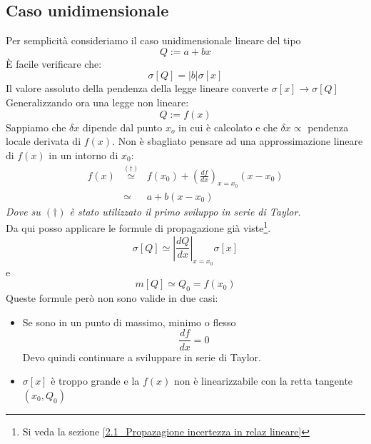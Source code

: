 \documentclass[11pt,a4paper]{book}
\begin{document}
\subsection{Caso unidimensionale} \label{Propagazione incertezza in relazione lineare}
Per semplicità consideriamo il caso unidimensionale lineare del tipo
\begin{equation}
 Q := a + bx
\end{equation}
\`{E} facile verificare che:
\begin{equation}
\sigma[Q] = | b | \sigma[x]
\end{equation}
Il valore assoluto della pendenza della legge lineare converte $ \sigma [x] \to \sigma[Q]$
Generalizzando ora una legge non lineare:
\begin{equation}
 Q := f(x)
\end{equation}
Sappiamo che $ \delta x $ dipende dal punto $ x_o $ in cui è calcolato e che $ \delta x \propto $ pendenza locale derivata di $ f(x) $. Non è sbagliato pensare ad una approssimazione lineare di $ f(x) $ in un intorno di $ x_0 $:
\begin{eqnarray}
f(x)  &\stackrel{(\dag)}{\simeq}& f(x_0)+ \left( \frac{df}{dx}\right)_{x = x_0} (x-x_0)	\\
&\simeq& a +b(x - x_0)
\end{eqnarray}
\textit{Dove su $ (\dag) $ è stato utilizzato il primo sviluppo in serie di Taylor.}\\
Da qui posso applicare le formule di propagazione già viste\footnote{Si veda la sezione \ref{2.1_Propazagione incertezza in relaz lineare}}.
\begin{equation}
\sigma[Q]\simeq \left| \frac{dQ}{dx} \right|_{x = x_0} \sigma[x]
\end{equation}
e
\begin{equation}
m[Q]\simeq Q_0 = f(x_0)
\end{equation}
Queste formule però non sono valide in due casi:
\begin{itemize}
\item Se sono in un punto di massimo, minimo o flesso
\begin{equation}
\frac{df}{dx}= 0
\end{equation}
Devo quindi continuare a sviluppare in serie di Taylor.
\item $ \sigma[x] $ è troppo grande e la $ f(x) $ non è linearizzabile con la retta tangente $ (x_0,Q_0) $
\end{itemize}
\end{document}
